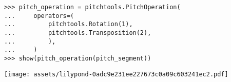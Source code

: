 \begin{comment}
<abjad>
pitch_operation = pitchtools.PitchOperation(
    operators=(
        pitchtools.Rotation(1),
        pitchtools.Transposition(2),
        ),
    )
show(pitch_operation(pitch_segment))
</abjad>
\end{comment}

\begin{abjadbookoutput}
\begin{singlespacing}
\vspace{-0.5\baselineskip}
\begin{lstlisting}
>>> pitch_operation = pitchtools.PitchOperation(
...     operators=(
...         pitchtools.Rotation(1),
...         pitchtools.Transposition(2),
...         ),
...     )
>>> show(pitch_operation(pitch_segment))
\end{lstlisting}
\noindent\texttt{[image: assets/lilypond-0adc9e231ee227673c0a09c603241ec2.pdf]}
\end{singlespacing}
\end{abjadbookoutput}